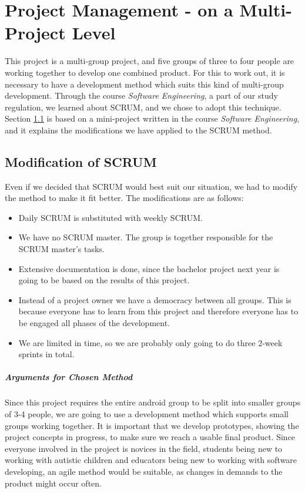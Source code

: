 \chapter{Project Management - on a Multi-Project Level}
	\label{cha:project_management}

This project is a multi-group project, and five groups of three to four people are working together to develop one combined product. For this to work out, it is necessary to have a development method which suits this kind of multi-group development. Through the course \textit{Software Engineering}, a part of our study regulation, we learned about SCRUM, and we chose to adopt this technique.\\
Section \ref{sec:mod_of_scrum} is based on a mini-project written in the course \textit{Software Engineering}, and it explains the modifications we have applied to the SCRUM method.

\section{Modification of SCRUM}
	\label{sec:mod_of_scrum}
Even if we decided that SCRUM would best suit our situation, we had to modify the method to make it fit better. The modifications are as follows:
	\begin{itemize}
		\item Daily SCRUM is substituted with weekly SCRUM.
		\item We have no SCRUM master. The group is together responsible for the SCRUM master's tasks.
		\item Extensive documentation is done, since the bachelor project next year is going to be based on the results of this project.
		\item Instead of a project owner we have a democracy between all groups. This is because everyone has to learn from this project and therefore everyone has to be engaged all phases of the development.
		\item We are limited in time, so we are probably only going to do three 2-week sprints in total.
	\end{itemize}

\paragraph{Arguments for Chosen Method}
Since this project requires the entire android group to be split into smaller groups of 3-4 people, we are going to use a development method which supports small groups working together.
   It is important that we develop prototypes, showing the project concepts in progress, to make sure we reach a usable final product.
   Since everyone involved in the project is novices in the field, students being new to working with autistic children and educators being new to working with software developing, an agile method would be suitable, as changes in demands to the product might occur often.\\

